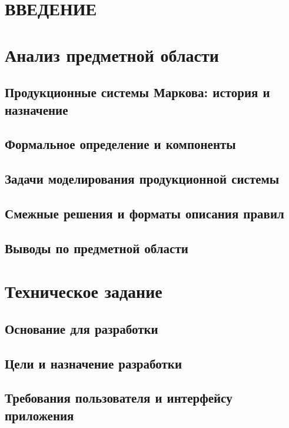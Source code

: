 \documentclass[a4paper,12pt]{report}
\begin{document}
	
	\tableofcontents
	\newpage
	
	\chapter*{ВВЕДЕНИЕ}
	
	\chapter{Анализ предметной области}
	\section{Продукционные системы Маркова: история и назначение}
	\section{Формальное определение и компоненты}
	\section{Задачи моделирования продукционной системы}
	\section{Смежные решения и форматы описания правил}
	\section{Выводы по предметной области}
	
	\chapter{Техническое задание}
	\section{Основание для разработки}
	\section{Цели и назначение разработки}
	\section{Требования пользователя и интерфейсу приложения}
\end{document}
